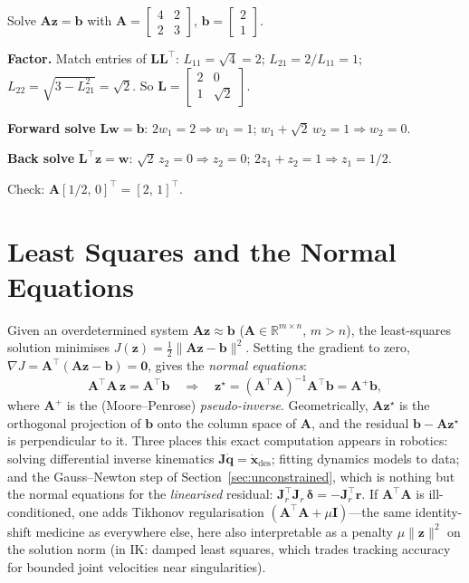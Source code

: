 \documentclass[11pt,twoside]{report}
\theoremstyle{definition}
\theoremstyle{plain}
\theoremstyle{remark}
\newcommand{\R}{\mathbb{R}}
\newcommand{\x}{\bm{x}}
\newcommand{\q}{\bm{q}}
\newcommand{\rr}{\bm{r}}
\newcommand{\0}{\bm{0}}
\newcommand{\I}{\bm{I}}
\newcommand{\J}{\bm{J}}
\begin{document}
\begin{examplebox}
Solve $\bm{A}\bm{z}=\bm{b}$ with
$\bm{A}=\begin{bmatrix}4&2\\2&3\end{bmatrix}$,
$\bm{b}=\begin{bmatrix}2\\1\end{bmatrix}$.

\textbf{Factor.} Match entries of $\bm{L}\bm{L}^{\!\top}$:
$L_{11}=\sqrt{4}=2$;\;
$L_{21}=2/L_{11}=1$;\;
$L_{22}=\sqrt{3-L_{21}^{2}}=\sqrt{2}$. So
$\bm{L}=\begin{bmatrix}2&0\\1&\sqrt{2}\end{bmatrix}$.

\textbf{Forward solve} $\bm{L}\bm{w}=\bm{b}$:
$2w_{1}=2\Rightarrow w_{1}=1$;\;
$w_{1}+\sqrt{2}\,w_{2}=1\Rightarrow w_{2}=0$.

\textbf{Back solve} $\bm{L}^{\!\top}\bm{z}=\bm{w}$:
$\sqrt{2}\,z_{2}=0\Rightarrow z_{2}=0$;\;
$2z_{1}+z_{2}=1\Rightarrow z_{1}=1/2$.

Check: $\bm{A}[1/2,\,0]^{\!\top}=[2,\,1]^{\!\top}$. \checkmark
\end{examplebox}

\section{Least Squares and the Normal Equations}
\label{sec:least-squares}

Given an overdetermined system $\bm{A}\bm{z}\approx\bm{b}$
($\bm{A}\in\R^{m\times n}$, $m>n$), the least-squares solution
minimises $J(\bm{z})=\tfrac12\|\bm{A}\bm{z}-\bm{b}\|^{2}$.
Setting the gradient to zero,
$\nabla J=\bm{A}^{\!\top}(\bm{A}\bm{z}-\bm{b})=\0$, gives the
\emph{normal equations}:
\begin{equation}\label{eq:normal-eqs}
\bm{A}^{\!\top}\bm{A}\,\bm{z}=\bm{A}^{\!\top}\bm{b}
\quad\Longrightarrow\quad
\bm{z}^{\star}=(\bm{A}^{\!\top}\bm{A})^{-1}\bm{A}^{\!\top}\bm{b}
=\bm{A}^{+}\bm{b},
\end{equation}
where $\bm{A}^{+}$ is the (Moore--Penrose) \emph{pseudo-inverse}.
Geometrically, $\bm{A}\bm{z}^{\star}$ is the orthogonal projection of
$\bm{b}$ onto the column space of $\bm{A}$, and the residual
$\bm{b}-\bm{A}\bm{z}^{\star}$ is perpendicular to it.
Three places this exact computation appears in robotics:
solving differential inverse kinematics $\J\dot{\q}=\dot{\x}_{\text{des}}$;
fitting dynamics models to data; and the Gauss--Newton step of
Section~\ref{sec:unconstrained}, which is nothing but the normal
equations for the \emph{linearised} residual:
$\J_{r}^{\!\top}\J_{r}\,\bm{\delta}=-\J_{r}^{\!\top}\rr$.
If $\bm{A}^{\!\top}\bm{A}$ is ill-conditioned, one adds Tikhonov
regularisation $(\bm{A}^{\!\top}\bm{A}+\mu\I)$---the same
identity-shift medicine as everywhere else, here also interpretable as
a penalty $\mu\|\bm{z}\|^{2}$ on the solution norm (in IK: damped
least squares, which trades tracking accuracy for bounded joint
velocities near singularities).
\end{document}
